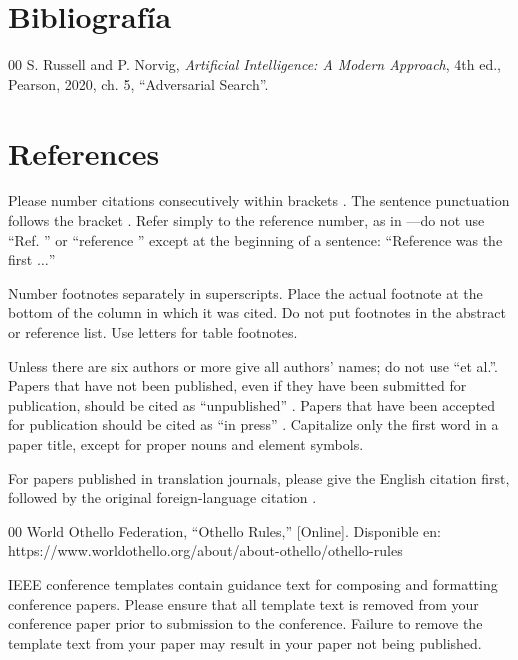 \documentclass[conference]{IEEEtran}
\begin{document}
\section{Bibliografía}

\begin{thebibliography}{00}
     S. Russell and P. Norvig, \textit{Artificial Intelligence: A Modern Approach}, 4th ed., Pearson, 2020, ch. 5, ``Adversarial Search''.

\end{thebibliography}



\section*{References}

Please number citations consecutively within brackets \cite{b1}. The 
sentence punctuation follows the bracket \cite{b2}. Refer simply to the reference 
number, as in \cite{b3}---do not use ``Ref. \cite{b3}'' or ``reference \cite{b3}'' except at 
the beginning of a sentence: ``Reference \cite{b3} was the first $\ldots$''

Number footnotes separately in superscripts. Place the actual footnote at 
the bottom of the column in which it was cited. Do not put footnotes in the 
abstract or reference list. Use letters for table footnotes.

Unless there are six authors or more give all authors' names; do not use 
``et al.''. Papers that have not been published, even if they have been 
submitted for publication, should be cited as ``unpublished'' \cite{b4}. Papers 
that have been accepted for publication should be cited as ``in press'' \cite{b5}. 
Capitalize only the first word in a paper title, except for proper nouns and 
element symbols.

For papers published in translation journals, please give the English 
citation first, followed by the original foreign-language citation \cite{b6}.

\begin{thebibliography}{00}
 World Othello Federation, ``Othello Rules,'' [Online]. Disponible en: https://www.worldothello.org/about/about-othello/othello-rules\end{thebibliography}

\vspace{12pt}
\color{red}
IEEE conference templates contain guidance text for composing and formatting conference papers. Please ensure that all template text is removed from your conference paper prior to submission to the conference. Failure to remove the template text from your paper may result in your paper not being published.
\end{document}
